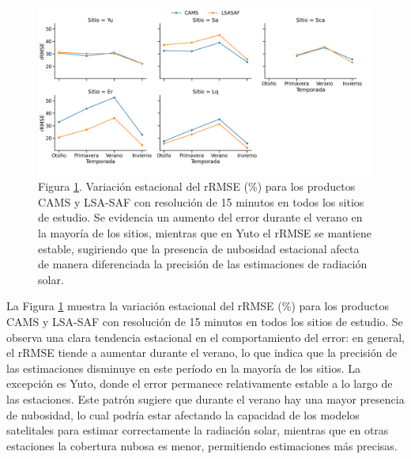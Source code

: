 \begin{figure} 
\centering 
\includegraphics[width=\linewidth]{figuras/season_15_tesis.png}
 \caption{Figura \ref{fig:season-15}. Variación estacional del rRMSE (\%) para los productos CAMS y LSA-SAF con resolución de 15 minutos en todos los sitios de estudio. Se evidencia un aumento del error durante el verano en la mayoría de los sitios, mientras que en Yuto el rRMSE se mantiene estable, sugiriendo que la presencia de nubosidad estacional afecta de manera diferenciada la precisión de las estimaciones de radiación solar.} 
\label{fig:season-15} 
\end{figure}


La Figura \ref{fig:season-15} muestra la variación estacional del rRMSE (\%) para los productos CAMS y LSA-SAF con resolución de 15 minutos en todos los sitios de estudio. Se observa una clara tendencia estacional en el comportamiento del error: en general, el rRMSE tiende a aumentar durante el verano, lo que indica que la precisión de las estimaciones disminuye en este período en la mayoría de los sitios. La excepción es Yuto, donde el error permanece relativamente estable a lo largo de las estaciones. Este patrón sugiere que durante el verano hay una mayor presencia de nubosidad, lo cual podría estar afectando la capacidad de los modelos satelitales para estimar correctamente la radiación solar, mientras que en otras estaciones la cobertura nubosa es menor, permitiendo estimaciones más precisas.







